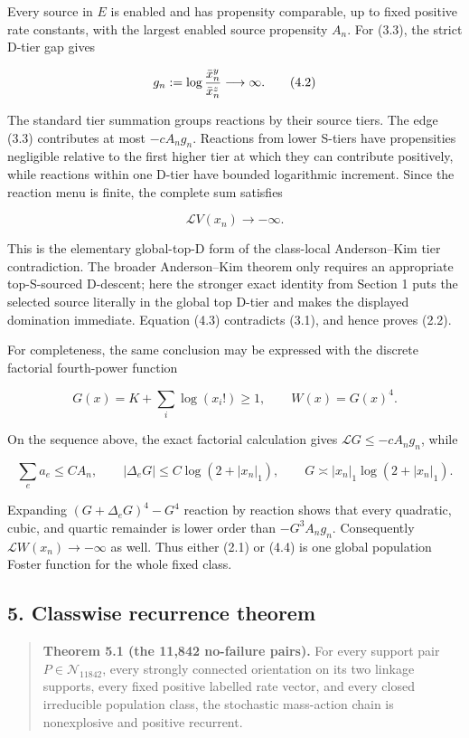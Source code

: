 Every source in \(E\) is enabled and has propensity comparable, up to
fixed positive rate constants, with the largest enabled source
propensity \(A_n\). For (3.3), the strict D-tier gap gives

\[
 g_n:=\log{\bar x_n^y\over\bar x_n^z}
                              \longrightarrow\infty. \tag{4.2}
\]

The standard tier summation groups reactions by their source tiers. The
edge (3.3) contributes at most \(-cA_ng_n\). Reactions from lower
S-tiers have propensities negligible relative to the first higher tier
at which they can contribute positively, while reactions within one
D-tier have bounded logarithmic increment. Since the reaction menu is
finite, the complete sum satisfies

\[
                          \mathcal LV(x_n)
                              \longrightarrow-\infty. \tag{4.3}
\]

This is the elementary global-top-D form of the class-local
Anderson--Kim tier contradiction. The broader Anderson--Kim theorem only
requires an appropriate top-S-sourced D-descent; here the stronger exact
identity from Section 1 puts the selected source literally in the global
top D-tier and makes the displayed domination immediate. Equation (4.3)
contradicts (3.1), and hence proves (2.2).

For completeness, the same conclusion may be expressed with the discrete
factorial fourth-power function

\[
 G(x)=K+\sum_i\log(x_i!)\ge1,
 \qquad W(x)=G(x)^4.                                  \tag{4.4}
\]

On the sequence above, the exact factorial calculation gives
\(\mathcal LG\le-cA_ng_n\), while

\[
 \sum_e a_e\le CA_n,
 \qquad |\Delta_eG|\le C\log(2+|x_n|_1),
 \qquad G\asymp |x_n|_1\log(2+|x_n|_1).             \tag{4.5}
\]

Expanding \((G+\Delta_eG)^4-G^4\) reaction by reaction shows that every
quadratic, cubic, and quartic remainder is lower order than
\(-G^3A_ng_n\). Consequently \(\mathcal LW(x_n)\to-\infty\) as well.
Thus either (2.1) or (4.4) is one global population Foster function for
the whole fixed class.

\subsection{5. Classwise recurrence
theorem}

\begin{quote}
\textbf{Theorem 5.1 (the 11,842 no-failure pairs).} For every support
pair \(P\in\mathcal N_{11842}\), every strongly connected orientation on
its two linkage supports, every fixed positive labelled rate vector, and
every closed irreducible population class, the stochastic mass-action
chain is nonexplosive and positive recurrent.
\end{quote}

